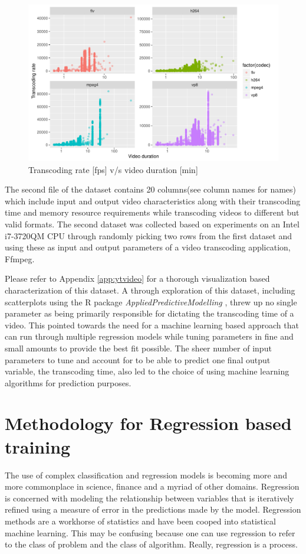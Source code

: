 \documentclass[letterpaper,12pt,titlepage,oneside,final]{report}
\begin{document}
        \begin{figure}[!h]
            \centering
            \includegraphics[width=\textwidth]{dur_vs_trate}
            \caption{Transcoding rate [fps] v/s video duration [min]}
            \label{dur_vs_trate}
        \end{figure}

        The second file of the dataset contains 20 columns(see column names for names) which include input and output video characteristics along with their transcoding time and memory resource requirements while transcoding videos to different but valid formats. The second dataset was collected based on experiments on an Intel i7-3720QM CPU through randomly picking two rows from the first dataset and using these as input and output parameters of a video transcoding application, Ffmpeg.

        Please refer to Appendix \ref{app:ytvideo} for a thorough visualization based characterization of this dataset. A through exploration of this dataset, including scatterplots using the R package \textit{AppliedPredictiveModelling} \cite{apppredic}, threw up no single parameter as being primarily responsible for dictating the transcoding time of a video. This pointed towards the need for a machine learning based approach that can run through multiple regression models while tuning parameters in fine and small amounts to provide the best fit possible. The sheer number of input parameters to tune and account for to be able to predict one final output variable, the transcoding time, also led to the choice of using machine learning algorithms for prediction purposes.

    \section {Methodology for Regression based training}
        The use of complex classification and regression models is becoming more and more commonplace in science, finance and a myriad of other domains. Regression is concerned with modeling the relationship between variables that is iteratively refined using a measure of error in the predictions made by the model. Regression methods are a workhorse of statistics and have been cooped into statistical machine learning. This may be confusing because one can use regression to refer to the class of problem and the class of algorithm. Really, regression is a process.
\end{document}
